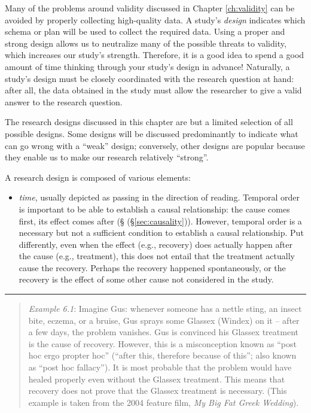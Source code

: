 \documentclass[
]{book}
\providecommand{\tightlist}{%
  \setlength{\itemsep}{0pt}\setlength{\parskip}{0pt}}
\begin{document}
Many of the problems around validity discussed in Chapter \ref{ch:validity} can be avoided by properly collecting high-quality data. A study's \emph{design} indicates which schema or plan will be used to collect the required data. Using a proper and strong design allows us to neutralize many of the possible threats to validity, which increases our study's strength. Therefore, it is a good idea to spend a good amount of time thinking through your study's design in advance! Naturally, a study's design must be closely coordinated with the research question at hand: after all, the data obtained in the study must allow the researcher to give a valid answer to the research question.

The research designs discussed in this chapter are but a limited selection of all possible designs. Some designs will be discussed predominantly to indicate what can go wrong with a ``weak'' design; conversely, other designs are popular because they enable us to make our research relatively ``strong''.

A research design is composed of various elements:

\begin{itemize}
\tightlist
\item
  \emph{time}, usually depicted as passing in the direction of reading. Temporal order is important to be able to establish a causal relationship: the cause comes first, its effect comes after (§ (§\ref{sec:causality})). However, temporal order is a necessary but not a sufficient condition to establish a causal relationship. Put differently, even when the effect (e.g., recovery) does actually happen after the cause (e.g., treatment), this does not entail that the treatment actually cause the recovery. Perhaps the recovery happened spontaneously, or the recovery is the effect of some other cause not considered in the study.
\end{itemize}

\begin{center}\rule{0.5\linewidth}{0.5pt}\end{center}

\begin{quote}
\emph{Example 6.1}: Imagine Gus: whenever someone has a nettle sting, an insect bite, eczema, or a bruise, Gus sprays some Glassex (Windex) on it -- after a few days, the problem vanishes. Gus is convinced his Glassex treatment is the cause of recovery. However, this is a misconception known as ``post hoc ergo propter hoc'' (``after this, therefore because of this''; also known as ``post hoc fallacy''). It is most probable that the problem would have healed properly even without the Glassex treatment. This means that recovery does not prove that the Glassex treatment is necessary. (This example is taken from the 2004 feature film, \emph{My Big Fat Greek Wedding}).
\end{quote}
\end{document}
